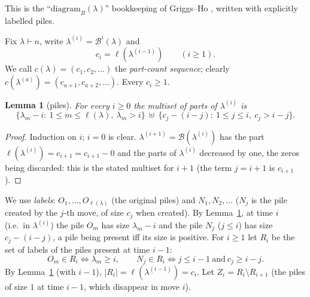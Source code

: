 \documentclass[11pt]{article}
\newtheorem{lemma}[theorem]{Lemma}
\theoremstyle{definition}
\newcommand{\B}{\mathcal{B}}
\newcommand{\R}{R}
\renewcommand{\le}{\leqslant}
\renewcommand{\ge}{\geqslant}
\begin{document}
This is the ``$\mathrm{diagram}_B(\lambda)$'' bookkeeping of Griggs--Ho \cite[\S3]{GH}, written with
explicitly labelled piles.

Fix $\lambda\vdash n$, write $\lambda^{(i)}=\B^i(\lambda)$ and
\[c_i=\ell(\lambda^{(i-1)})\qquad(i\ge1).\]
We call $c(\lambda)=(c_1,c_2,\dots)$ the \emph{part-count sequence}; clearly
$c(\lambda^{(a)})=(c_{a+1},c_{a+2},\dots)$.  Every $c_i\ge1$.

\begin{lemma}[piles]\label{lem:piles}
For every $i\ge0$ the multiset of parts of $\lambda^{(i)}$ is
\[\{\lambda_m-i:\ 1\le m\le\ell(\lambda),\ \lambda_m>i\}\ \uplus\ \{c_j-(i-j):\ 1\le j\le i,\ c_j>i-j\}.\]
\end{lemma}
\begin{proof}
Induction on $i$; $i=0$ is clear.  $\lambda^{(i+1)}=\B(\lambda^{(i)})$ has the part $\ell(\lambda^{(i)})=c_{i+1}=c_{i+1}-0$ and
the parts of $\lambda^{(i)}$ decreased by one, the zeros being discarded: this is the stated multiset for
$i+1$ (the term $j=i+1$ is $c_{i+1}$).
\end{proof}

We use \emph{labels}: $O_1,\dots,O_{\ell(\lambda)}$ (the original piles) and $N_1,N_2,\dots$ ($N_j$ is the pile
created by the $j$-th move, of size $c_j$ when created).  By Lemma~\ref{lem:piles}, at time $i$ (i.e.\ in
$\lambda^{(i)}$) the pile $O_m$ has size $\lambda_m-i$ and the pile $N_j$ ($j\le i$) has size $c_j-(i-j)$, a pile
being present iff its size is positive.  For $i\ge1$ let $\R_i$ be the set of labels of the piles present
at time $i-1$:
\begin{equation}\label{eq:alive}
O_m\in \R_i\iff\lambda_m\ge i,\qquad N_j\in \R_i\iff j\le i-1\ \text{and}\ c_j\ge i-j .
\end{equation}
By Lemma~\ref{lem:piles} (with $i-1$), $|\R_i|=\ell(\lambda^{(i-1)})=c_i$.  Let $Z_i=\R_i\setminus \R_{i+1}$ (the piles
of size $1$ at time $i-1$, which disappear in move $i$).
\end{document}
